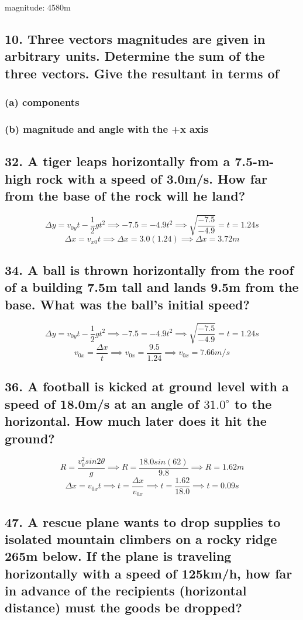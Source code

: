 \documentclass[12pt,a4paper,english]{article}
\newcommand{\degree}[1]{${#1}^\circ$}
\begin{document}
\begin{flushleft}
  magnitude: 4580m
  \subsection{10. Three vectors magnitudes are given in arbitrary units. Determine the sum of the three vectors. Give the resultant in terms of}
  \subsubsection{(a) components}
  \subsubsection{(b) magnitude and angle with the +x axis}
  \subsection{32. A tiger leaps horizontally from a 7.5-m-high rock with a speed of 3.0m/s. How far from the base of the rock will he land?}
  \[
    \Delta y=v_{0y}t-\frac{1}{2}gt^2 \implies -7.5=-4.9t^2\implies
    \sqrt{\frac{-7.5}{-4.9}}=t=1.24s
  \]
  \[
    \Delta x =v_{x0}t\implies
    \Delta x=3.0(1.24)\implies
    \Delta x=3.72m
  \]
  \subsection{34. A ball is thrown horizontally from the roof of a building 7.5m tall and lands 9.5m from the base. What was the ball's initial speed?}
  \[
    \Delta y=v_{0y}t-\frac{1}{2}gt^2 \implies 
    -7.5=-4.9t^2\implies
    \sqrt{\frac{-7.5}{-4.9}}=t=1.24s
  \]
  \[
  v_{0x}=\frac{\Delta x}{t}\implies
  v_{0x}=\frac{9.5}{1.24}\implies
  v_{0x}=7.66m/s
  \]
  \subsection{36. A football is kicked at ground level with a speed of 18.0m/s at an angle of \degree{31.0} to the horizontal. How much later does it hit the ground?}
\[
  R=\frac{v_0^2sin2\theta}{g}\implies
  R=\frac{18.0sin(62)}{9.8}\implies
  R=1.62m
\]
\[
  \Delta x=v_{0x}t\implies
  t=\frac{\Delta x}{v_{0x}}\implies
  t=\frac{1.62}{18.0}\implies
  t=0.09s
\]
  \subsection{47. A rescue plane wants to drop supplies to isolated mountain climbers on a rocky ridge 265m below. If the plane is traveling horizontally with a speed of 125km/h, how far in advance of the recipients (horizontal distance) must the goods be dropped?}

\end{flushleft}
\end{document}
